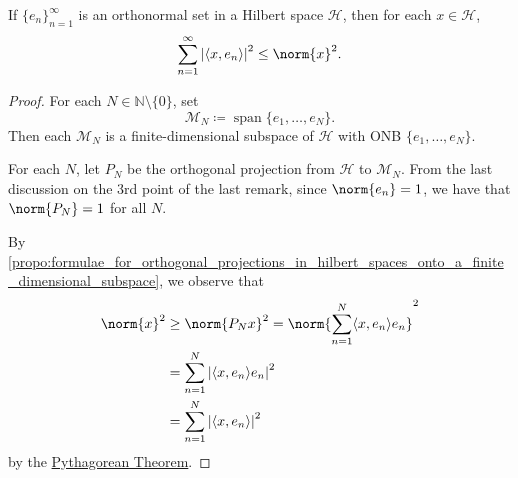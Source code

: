 \documentclass[notoc,notitlepage]{tufte-book}
\DeclareMathOperator{\Span}{span}
\begin{document}
\begin{thm}\label{thm:bessel_s_inequality}
  If $\{ e_n \}_{n=1}^{\infty}$ is an orthonormal set
  in a Hilbert space $\mathcal{H}$, then for each $x \in \mathcal{H}$,
  \begin{equation*}
    \sum_{n=1}^{\infty} \abs{ \langle x, e_n \rangle }^2 \leq \norm{x}^2.
  \end{equation*}
\end{thm}

\begin{proof}
  For each $N \in \mathbb{N} \setminus \{ 0 \}$, set
  \begin{equation*}
    \mathcal{M}_N \coloneqq \Span \{ e_1, \ldots, e_N \}.
  \end{equation*}
  Then each $\mathcal{M}_N$ is a finite-dimensional subspace of $\mathcal{H}$
  with ONB $\{ e_1, \ldots, e_N \}$.

  For each $N$, let $P_N$ be the orthogonal projection from $\mathcal{H}$ to $\mathcal{M}_N$.
  From the last discussion on the 3rd point of the last remark,
  since $\norm{e_n} = 1$, we have that $\norm{P_N} = 1$ for all $N$.

  By
  \cref{propo:formulae_for_orthogonal_projections_in_hilbert_spaces_onto_a_finite_dimensional_subspace},
  we observe that
  \begin{align*}
    \norm{x}^2 &\geq \norm{P_N x}^2
               = \norm{ \sum_{n=1}^{N} \langle x, e_n \rangle e_n }^2 \\
              &= \sum_{n=1}^{N} \abs{\langle x, e_n \rangle e_n}^2 \\
              &= \sum_{n=1}^{N} \abs{\langle x, e_n \rangle}^2
  \end{align*}
  by the \hyperref[thm:the_pythagorean_theorem_and_parallelogram_law]{Pythagorean Theorem}.
\end{proof}












\appendix

\backmatter

\fancyhead[LE]{\thepage \enspace \textsl{\leftmark}}



\printindex
\end{document}
